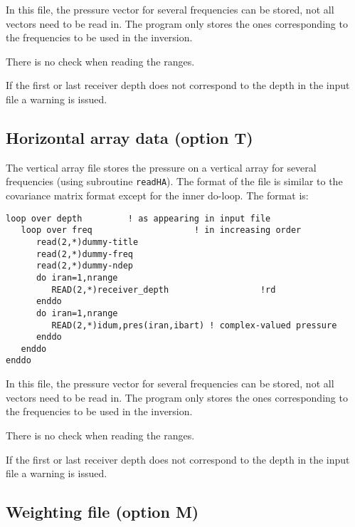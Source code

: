 \documentclass{saclantc}
\begin{document}
In this file, the pressure vector for several frequencies can be stored,
not all vectors need to be read in.  The program only
stores  the ones corresponding to the frequencies to be used in the
inversion.

There is no check when reading the ranges. 

If the first or last receiver depth does not correspond to the
depth in the input file a warning is issued.
\subsection{Horizontal array data (option T)}
\label{se:opt_T}
The   vertical array file stores  
the pressure on a vertical array for several  frequencies 
(using subroutine {\tt read\-HA}).
The format of the file is similar to the 
covariance matrix format except for the inner do-loop.
The format is:

\small
\begin{verbatim} 
loop over depth         ! as appearing in input file
   loop over freq                    ! in increasing order
      read(2,*)dummy-title
      read(2,*)dummy-freq 
      read(2,*)dummy-ndep
      do iran=1,nrange
         READ(2,*)receiver_depth                  !rd
      enddo
      do iran=1,nrange
         READ(2,*)idum,pres(iran,ibart) ! complex-valued pressure
      enddo
   enddo
enddo
\end{verbatim}
\normalsize
 
In this file, the pressure vector for several frequencies can be stored,
not all vectors need to be read in.  The program only
stores  the ones corresponding to the frequencies to be used in the
inversion.

There is no check when reading the ranges. 

If the first or last receiver depth does not correspond to the
depth in the input file a warning is issued.


\subsection{Weighting file (option M)}
\label{se:opt_M}
\end{document}
